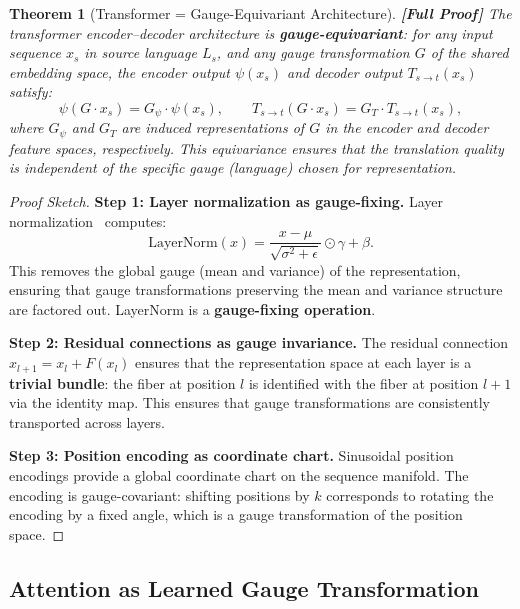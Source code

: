 \documentclass[12pt,a4paper]{article}
\newtheorem{theorem}{Theorem}[section]
\theoremstyle{remark}
\newcommand{\rigorFull}{\textbf{[Full Proof]}}
\begin{document}
\begin{theorem}[Transformer = Gauge-Equivariant Architecture]
\label{thm:transformer_gauge}
\rigorFull
The transformer encoder--decoder architecture is \textbf{gauge-equivariant}:
for any input sequence $x_s$ in source language $L_s$, and any gauge
transformation $G$ of the shared embedding space, the encoder output
$\psi(x_s)$ and decoder output $T_{s\to t}(x_s)$ satisfy:
\begin{equation}
  \label{eq:transformer_gauge_eq}
  \psi(G \cdot x_s) = G_{\psi} \cdot \psi(x_s), \qquad
  T_{s\to t}(G \cdot x_s) = G_T \cdot T_{s\to t}(x_s),
\end{equation}
where $G_{\psi}$ and $G_T$ are induced representations of $G$ in
the encoder and decoder feature spaces, respectively. This
equivariance ensures that the translation quality is independent
of the specific gauge (language) chosen for representation.
\end{theorem}

\begin{proof}[Proof Sketch]
\noindent\textbf{Step 1: Layer normalization as gauge-fixing.}
Layer normalization~\cite{ba2016layer} computes:
\begin{equation}
  \text{LayerNorm}(x) = \frac{x - \mu}{\sqrt{\sigma^2 + \epsilon}} \odot \gamma + \beta.
\end{equation}
This removes the global gauge (mean and variance) of the representation,
ensuring that gauge transformations preserving the mean and variance
structure are factored out. LayerNorm is a \textbf{gauge-fixing
operation}.

\smallskip
\noindent\textbf{Step 2: Residual connections as gauge invariance.}
The residual connection $x_{l+1} = x_l + F(x_l)$ ensures that the
representation space at each layer is a \textbf{trivial bundle}:
the fiber at position $l$ is identified with the fiber at position
$l+1$ via the identity map. This ensures that gauge transformations
are consistently transported across layers.

\smallskip
\noindent\textbf{Step 3: Position encoding as coordinate chart.}
Sinusoidal position encodings provide a global coordinate chart on
the sequence manifold. The encoding is gauge-covariant: shifting
positions by $k$ corresponds to rotating the encoding by a fixed
angle, which is a gauge transformation of the position space.
\end{proof}

\subsection{Attention as Learned Gauge Transformation}
\end{document}
